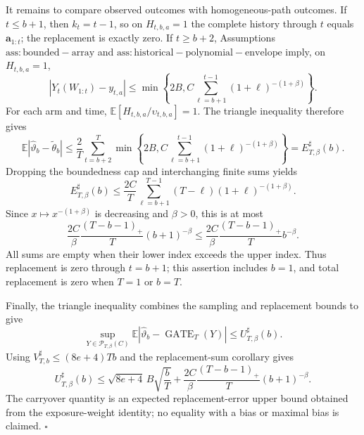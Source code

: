 It remains to compare observed outcomes with homogeneous-path outcomes. If \(t\le b+1\), then \(k_t=t-1\), so on \(H_{t,b,a}=1\) the complete history through \(t\) equals \(\mathbf a_{1:t}\); the replacement is exactly zero. If \(t\ge b+2\), Assumptions~\(\mathrm{ass:bounded-array}\) and \(\mathrm{ass:historical-polynomial-envelope}\) imply, on \(H_{t,b,a}=1\),
\[
|Y_t(W_{1:t})-y_{t,a}|
\le\min\left\{2B,C\sum_{\ell=b+1}^{t-1}(1+\ell)^{-(1+\beta)}\right\}.
\]
For each arm and time, \(\mathbb E[H_{t,b,a}/\upsilon_{t,b,a}]=1\). The triangle inequality therefore gives
\[
\mathbb E|\widehat\vartheta_b-\widetilde\theta_b|
\le\frac2T\sum_{t=b+2}^T
\min\left\{2B,C\sum_{\ell=b+1}^{t-1}(1+\ell)^{-(1+\beta)}\right\}
=E_{T,\beta}^{\sharp}(b).
\]
Dropping the boundedness cap and interchanging finite sums yields
\[
E_{T,\beta}^{\sharp}(b)
\le\frac{2C}{T}\sum_{\ell=b+1}^{T-1}(T-\ell)(1+\ell)^{-(1+\beta)}.
\]
Since \(x\mapsto x^{-(1+\beta)}\) is decreasing and \(\beta>0\), this is at most
\[
\frac{2C}{\beta}\frac{(T-b-1)_+}{T}(b+1)^{-\beta}
\le\frac{2C}{\beta}\frac{(T-b-1)_+}{T}b^{-\beta}.
\]
All sums are empty when their lower index exceeds the upper index. Thus replacement is zero through \(t=b+1\); this assertion includes \(b=1\), and total replacement is zero when \(T=1\) or \(b=T\).

Finally, the triangle inequality combines the sampling and replacement bounds to give
\[
\sup_{Y\in\mathcal P_{T,\beta}(C)}
\mathbb E|\widehat\vartheta_b-\operatorname{GATE}_T(Y)|
\le U_{T,\beta}^{\sharp}(b).
\]
Using \(V_{T,b}^{\sharp}\le(8e+4)Tb\) and the replacement-sum corollary gives
\[
U_{T,\beta}^{\sharp}(b)
\le\sqrt{8e+4}\,B\sqrt{\frac bT}
+\frac{2C}{\beta}\frac{(T-b-1)_+}{T}(b+1)^{-\beta}.
\]
The carryover quantity is an expected replacement-error upper bound obtained from the exposure-weight identity; no equality with a bias or maximal bias is claimed. \(\square\)